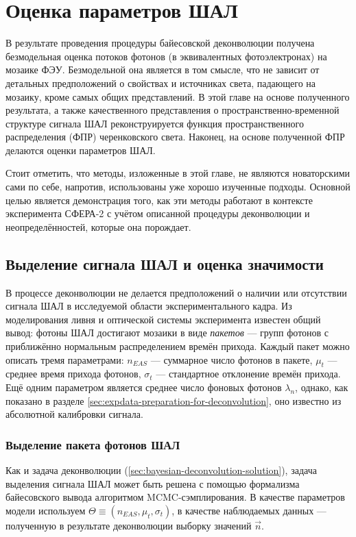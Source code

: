 \chapter{Оценка параметров ШАЛ}

В результате проведения процедуры байесовской деконволюции получена безмодельная оценка потоков фотонов (в эквивалентных фотоэлектронах) на мозаике ФЭУ. Безмодельной она является в том смысле, что не зависит от детальных предположений о свойствах и источниках света, падающего на мозаику, кроме самых общих представлений. В этой главе на основе полученного результата, а также качественного представления о пространственно-временной структуре сигнала ШАЛ реконструируется функция пространственного распределения (ФПР) черенковского света. Наконец, на основе полученной ФПР делаются оценки параметров ШАЛ.

Стоит отметить, что методы, изложенные в этой главе, не являются новаторскими сами по себе, напротив, использованы уже хорошо изученные подходы. Основной целью является демонстрация того, как эти методы работают в контексте эксперимента СФЕРА-2 с учётом описанной процедуры деконволюции и неопределённостей, которые она порождает.

\section{Выделение сигнала ШАЛ и оценка значимости}

В процессе деконволюции не делается предположений о наличии или отсутствии сигнала ШАЛ в исследуемой области экспериментального кадра. Из моделирования ливня и оптической системы эксперимента известен общий вывод: фотоны ШАЛ достигают мозаики в виде \textit{пакетов} --- групп фотонов с приближённо нормальным распределением времён прихода. Каждый пакет можно описать тремя параметрами: $n_{EAS}$ --- суммарное число фотонов в пакете, $\mu_t$ --- среднее время прихода фотонов, $\sigma_t$ --- стандартное отклонение времён прихода. Ещё одним параметром является среднее число фоновых фотонов $\lambda_{n}$, однако, как показано в разделе \ref{sec:expdata-preparation-for-deconvolution}, оно известно из абсолютной калибровки сигнала.

\subsection{Выделение пакета фотонов ШАЛ}

\label{sec:signal-reconstruction}

Как и задача деконволюции (\ref{sec:bayesian-deconvolution-solution}), задача выделения сигнала ШАЛ может быть решена с помощью формализма байесовского вывода алгоритмом MCMC-сэмплирования. В качестве параметров модели используем $\Theta \equiv (n_{EAS}, \mu_t, \sigma_t)$, в качестве наблюдаемых данных --- полученную в результате деконволюции выборку значений $\vec{n}$.

